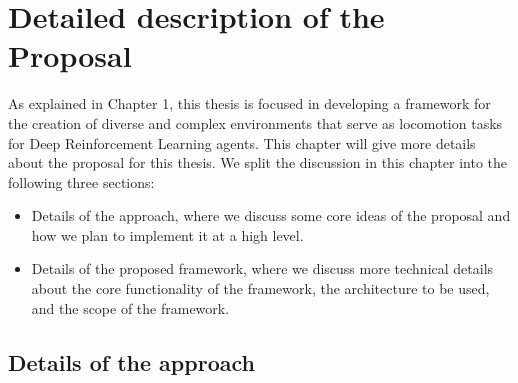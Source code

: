 
\chapter{Detailed description of the Proposal}
\label{ch:proposal}



As explained in Chapter 1, this thesis is focused  in developing a framework for 
the creation of diverse and complex environments that serve as locomotion tasks 
for Deep Reinforcement Learning agents. This chapter will give more details about the 
proposal for this thesis. We split the discussion in this chapter into the following 
three sections: 

\begin{itemize}
    \item Details of the approach, where we discuss some core ideas of the proposal and
          how we plan to implement it at a high level.
    \item Details of the proposed framework, where we discuss more technical details about
          the core functionality of the framework, the architecture to be used, 
          and the scope of the framework.
\end{itemize}

\section{Details of the approach}


